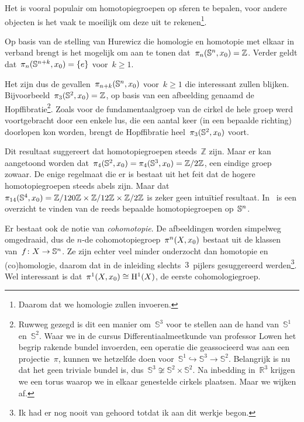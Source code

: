 \documentclass[a4paper,11pt,openany,oneside,article]{memoir}
\begin{document}
\begin{example}
  Het is vooral populair om homotopiegroepen op sferen te bepalen, voor andere objecten is het vaak te moeilijk om deze uit te rekenen\footnote{Daarom dat we homologie zullen invoeren.}.

  Op basis van de stelling van Hurewicz die homologie en homotopie met elkaar in verband brengt is het mogelijk om aan te tonen dat~$\pi_n(\mathbb{S}^n,x_0)=\mathbb{Z}$. Verder geldt dat~$\pi_n(\mathbb{S}^{n+k},x_0)=\left\{ e \right\}$ voor~$k\geq 1$.

  Het zijn dus de gevallen~$\pi_{n+k}(\mathbb{S}^n,x_0)$ voor~$k\geq 1$ die interessant zullen blijken. Bijvoorbeeld~$\pi_3(\mathbb{S}^2,x_0)=\mathbb{Z}$, op basis van een afbeelding genaamd de Hopf{}fibratie\footnote{Ruwweg gezegd is dit een manier om~$\mathbb{S}^3$ voor te stellen aan de hand van~$\mathbb{S}^1$ en~$\mathbb{S}^2$. Waar we in de cursus Differentiaalmeetkunde van professor Lowen het begrip rakende bundel invoerden, een operatie die geassocieerd was aan een projectie~$\pi$, kunnen we hetzelfde doen voor~$\mathbb{S}^1\hookrightarrow\mathbb{S}^3\to\mathbb{S}^2$. Belangrijk is nu dat het geen triviale bundel is, dus~$\mathbb{S}^3\not\cong\mathbb{S}^2\times\mathbb{S}^2$. Na inbedding in~$\mathbb{R}^3$ krijgen we een torus waarop we in elkaar genestelde cirkels plaatsen. Maar we wijken af.}. Zoals voor de fundamentaalgroep van de cirkel de hele groep werd voortgebracht door een enkele lus, die een aantal keer (in een bepaalde richting) doorlopen kon worden, brengt de Hopf{}fibratie heel~$\pi_3(\mathbb{S}^2,x_0)$ voort.
  
  Dit resultaat suggereert dat homotopiegroepen steeds~$\mathbb{Z}$ zijn. Maar er kan aangetoond worden dat~$\pi_4(\mathbb{S}^2,x_0)=\pi_4(\mathbb{S}^3,x_0)=\mathbb{Z}/2\mathbb{Z}$, een eindige groep zowaar. De enige regelmaat die er is bestaat uit het feit dat de hogere homotopiegroepen steeds abels zijn. Maar dat~$\pi_{14}(\mathbb{S}^4,x_0)=\mathbb{Z}/120\mathbb{Z}\times\mathbb{Z}/12\mathbb{Z}\times\mathbb{Z}/2\mathbb{Z}$ is zeker geen intu\"itief resultaat. In~\cite{composition-methods} is een overzicht te vinden van de reeds bepaalde homotopiegroepen op~$\mathbb{S}^n$.
\end{example}

\begin{remark}
  Er bestaat ook de notie van \emph{cohomotopie}. De afbeeldingen worden simpelweg omgedraaid, dus de $n$\nobreakdash-de cohomotopiegroep~$\pi^n(X,x_0)$ bestaat uit de klassen van~$f\colon X\to\mathbb{S}^n$. Ze zijn echter veel minder onderzocht dan homotopie en (co)homologie, daarom dat in de inleiding slechts~$3$~pijlers gesuggereerd werden\footnote{Ik had er nog nooit van gehoord totdat ik aan dit werkje begon.}. Wel interessant is dat~$\pi^1(X,x_0)\cong\mathrm{H}^1(X)$, de eerste cohomologiegroep.
\end{remark}
\end{document}
